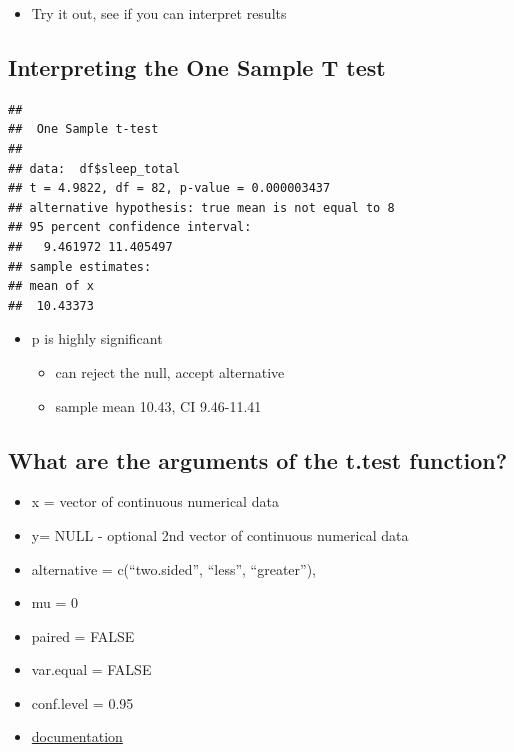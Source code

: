 \documentclass[
]{book}
\providecommand{\tightlist}{%
  \setlength{\itemsep}{0pt}\setlength{\parskip}{0pt}}
\begin{document}
\begin{itemize}
\tightlist
\item
  Try it out, see if you can interpret results
\end{itemize}

\hypertarget{interpreting-the-one-sample-t-test}{%
\subsection{Interpreting the One Sample T test}\label{interpreting-the-one-sample-t-test}}

\begin{verbatim}
## 
##  One Sample t-test
## 
## data:  df$sleep_total
## t = 4.9822, df = 82, p-value = 0.000003437
## alternative hypothesis: true mean is not equal to 8
## 95 percent confidence interval:
##   9.461972 11.405497
## sample estimates:
## mean of x 
##  10.43373
\end{verbatim}

\begin{itemize}
\tightlist
\item
  p is highly significant

  \begin{itemize}
  \tightlist
  \item
    can reject the null, accept alternative
  \item
    sample mean 10.43, CI 9.46-11.41
  \end{itemize}
\end{itemize}

\hypertarget{what-are-the-arguments-of-the-t.test-function}{%
\subsection{What are the arguments of the t.test function?}\label{what-are-the-arguments-of-the-t.test-function}}

\begin{itemize}
\tightlist
\item
  x = vector of continuous numerical data
\item
  y= NULL - optional 2nd vector of continuous numerical data
\item
  alternative = c(``two.sided'', ``less'', ``greater''),
\item
  mu = 0
\item
  paired = FALSE
\item
  var.equal = FALSE
\item
  conf.level = 0.95
\item
  \href{https://www.rdocumentation.org/packages/stats/versions/3.5.1/topics/t.test}{documentation}
\end{itemize}
\end{document}
